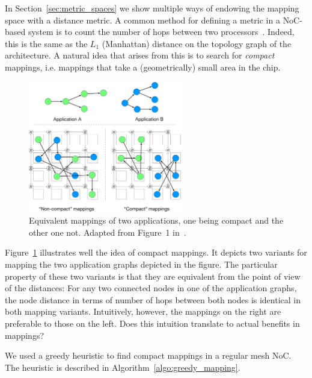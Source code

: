 In Section~\ref{sec:metric_spaces} we show multiple ways of endowing the mapping space with a distance metric.
A common method for defining a metric in a \ac{NoC}-based system is to count the number of hops between two processors~\cite{singh2010communication,schwarzer2017symmetry}.
Indeed, this is the same as the $L_1$ (Manhattan) distance on the topology graph of the architecture.
A natural idea that arises from this is to search for \emph{compact} mappings, i.e. mappings that take a (geometrically) small area in the chip.


\begin{figure}[th]
	\centering
	\includegraphics[width=0.6\textwidth]{figures/compact_intro.pdf}
	\caption{Equivalent mappings of two applications, one being compact and the other one not. Adapted from Figure~1 in~\cite{goens_samos19}.}
	\label{fig:compact_intro}
\end{figure}

Figure~\ref{fig:compact_intro} illustrates well the idea of compact mappings.
It depicts two variants for mapping the two application graphs depicted in the figure.
The particular property of these two variants is that they are equivalent from the point of view of the distances:
For any two connected nodes in one of the application graphs, the node distance in terms of number of hops between both nodes is identical in both mapping variants.
Intuitively, however, the mappings on the right are preferable to those on the left. 
Does this intuition translate to actual benefits in mappings?

We used a greedy heuristic to find compact mappings in a regular mesh \ac{NoC}.
The heuristic is described in Algorithm~\ref{algo:greedy_mapping}.

